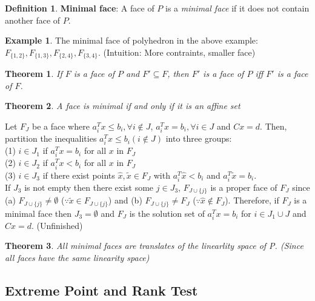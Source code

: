 \documentclass[10pt]{article}
\def\em{\emptyset}
\newtheorem{thm}{Theorem}[section]
\theoremstyle{definition}
\newtheorem{defn}{Definition}[section]
\newtheorem{example}{Example}[section]
\begin{document}
\begin{defn}\textbf{Minimal face}:
	A face of $P$ is a \textit{minimal face} if it does not contain another face of $P$.
\end{defn}

\begin{example}
	The minimal face of polyhedron in the above example: $F_{\{1,2\}}, F_{\{1,3\}}, F_{\{2, 4\}}, F_{\{3,4\}}$.
	(Intuition: More contraints, smaller face)
\end{example}

\begin{thm}
	If $F$ is a face of $P$ and $F' \subseteq F$, then $F'$ is a face of $P$ iff $F'$ is a face of $F$.
\end{thm}

\begin{thm}
	A face is minimal if and only if it is an affine set
\end{thm}

\proof Let $F_J$ be a face where $a_{i}^Tx \le b_i, \forall i \not\in J$, $a_{i}^Tx = b_i, \forall i \in J$
and $Cx = d$. Then, partition the inequalities $a_{i}^Tx \le b_i (i \not\in J)$ into three groups:\\
(1) $i \in J_{1}$ if $a_{i}^Tx = b_{i}$ for all $x$ in $F_{J}$\\
(2) $i \in J_{2}$ if $a_{i}^Tx < b_{i}$ for all $x$ in $F_{J}$\\
(3) $i \in J_{3}$ if there exist points $\hat{x}, \tilde{x} \in F_{J}$ with $a_{i}^T\hat{x} < b_{i}$
and $a_{i}^T\tilde{x} = b_{i}$.\\
If $J_{3}$ is not empty then there exist some $j \in J_{3}$, $F_{J\cup \{j\}}$ is a proper face of $F_{J}$ since\\
(a) $F_{J\cup \{j\}} \neq \em$ ($ \because \tilde{x}\in F_{J\cup \{j\}}$) and
(b) $F_{J\cup \{j\}} \neq F_{J}$ ($\because \hat{x}\not\in F_{J}$).
Therefore, if $F_{J}$ is a minimal face then $J_{3} = \em$ and $F_{J}$ is the solution set of
$a_{i}^Tx = b_{i}$ for $i \in J_{1} \cup J$ and $Cx = d$. (Unfinished)
\qedhere

\begin{thm}
	All minimal faces are translates of the linearlity space of P.
	(Since all faces have the same linearity space)
\end{thm}

\subsection{Extreme Point and Rank Test}
\end{document}
